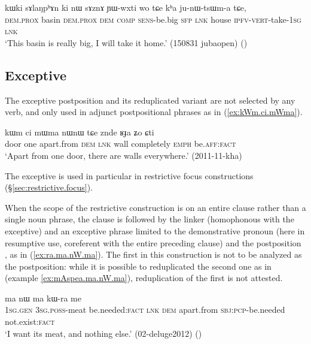 \begin{exe}
\ex \label{ex:nW.sAznA.YWwxti}
\gll kɯki sɤlaŋpʰɤn ki nɯ sɤznɤ ɲɯ-wxti wo tɕe kʰa ju-nɯ-tsɯm-a tɕe, \\
\textsc{dem}.\textsc{prox} basin \textsc{dem}.\textsc{prox}  \textsc{dem} \textsc{comp}  \textsc{sens}-be.big \textsc{sfp} \textsc{lnk} house \textsc{ipfv}-\textsc{vert}-take-\textsc{1sg} \textsc{lnk} \\
\glt `This basin is really big, I will take it home.' (150831 jubaopen)
()
\end{exe}

\subsection{Exceptive} \label{sec:exceptive} %
The exceptive postposition  and its reduplicated variant  are not selected by any verb, and only used in adjunct postpositional phrases as in (\ref{ex:kWm.ci.mWma}).

 \begin{exe}
 \ex \label{ex:kWm.ci.mWma}
 \gll kɯm ci mɯma nɯnɯ tɕe znde ʁɟa ʑo ɕti \\
 door one apart.from \textsc{dem} \textsc{lnk} wall completely \textsc{emph} be.\textsc{aff}:\textsc{fact} \\
 \glt `Apart from one door, there are walls everywhere.' (2011-11-kha)
\end{exe}

The exceptive  is used in particular in restrictive focus constructions (§\ref{sec:restrictive.focus}).

When the scope of the restrictive construction is on an entire clause rather than a single noun phrase, the clause is followed by the linker  (homophonous with the exceptive) and an exceptive phrase limited to the demonstrative pronoun  (here in resumptive use, coreferent with the entire preceding clause) and the postposition , as in (\ref{ex:ra.ma.nW.ma}). The first  in this construction is not to be analyzed as the postposition: while it is possible to reduplicated the second one as in  (example \ref{ex:mAspea.ma.nW.ma}), reduplication of the first  is not attested.

 \begin{exe}
 \ex \label{ex:ra.ma.nW.ma}
 \gll [aʑɯɣ ɯ-ɕa ra] ma nɯ ma kɯ-ra me \\
 \textsc{1sg}.\textsc{gen} \textsc{3sg}.\textsc{poss}-meat be.needed:\textsc{fact} \textsc{lnk} \textsc{dem} apart.from \textsc{sbj}:\textsc{pcp}-be.needed not.exist:\textsc{fact} \\
 \glt `I want its meat, and nothing else.' (02-deluge2012)
()
\end{exe}

